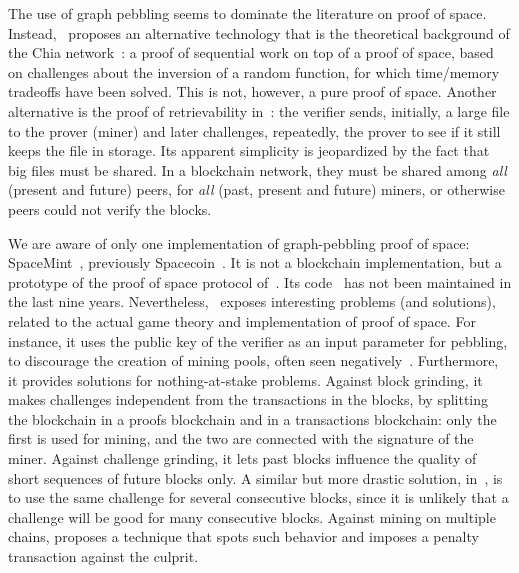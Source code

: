 The use of graph pebbling seems to dominate the literature on proof of space.
Instead, \cite{AbusalahACKPR17}~proposes an alternative technology that is the
theoretical background of the Chia network~\cite{CohenP19,Chia}:
a proof of sequential work on top of a proof of space, based on challenges
about the inversion of a random function, for which time/memory tradeoffs have been solved.
This is not, however, a pure proof of space.
Another alternative is the proof of retrievability
in~\cite{JuelsK07}: the verifier sends, initially,
a large file to the prover (miner) and later challenges, repeatedly, the prover to see
if it still keeps the file in storage. Its apparent simplicity
is jeopardized by the fact that big files must be shared.
In a blockchain network, they must be shared among \emph{all} (present and future)
peers, for \emph{all} (past, present and future) miners, or otherwise peers
could not verify the blocks.

We are aware of only one implementation of graph-pebbling proof of space:
SpaceMint~\cite{ParkKFGAP18}, previously Spacecoin~\cite{ParkPAFG15}.
It is not a blockchain implementation,
but a prototype of the proof of space protocol of~\cite{DziembowskiFKP15}.
Its code~\cite{SpaceMintCode} has not been maintained in the last nine years.
Nevertheless, \cite{ParkKFGAP18}~exposes interesting problems (and solutions),
related to the actual game theory and implementation of proof of space.
For instance, it uses the public key of the verifier as an input parameter
for pebbling, to discourage the creation of mining pools, often seen
negatively~\cite{MillerKKS15}.
Furthermore, it provides solutions for nothing-at-stake problems. Against block grinding,
it makes challenges independent from the transactions in the blocks, by splitting the
blockchain in a proofs blockchain and in a transactions blockchain:
only the first is used for mining,
and the two are connected with the signature of the miner.
Against challenge grinding, it lets past blocks influence the quality of short sequences
of future blocks only. A similar but more drastic solution, in~\cite{CohenP19}, is to
use the same challenge for several consecutive blocks,
since it is unlikely that a challenge will be good for many consecutive blocks.
Against mining on multiple chains, \cite{ParkKFGAP18} proposes
a technique that spots such behavior and
imposes a penalty transaction against the culprit.

